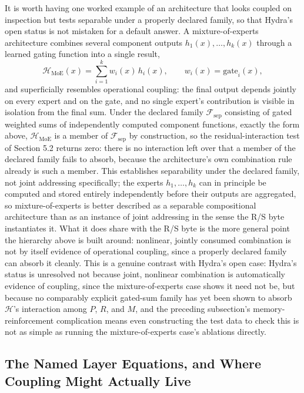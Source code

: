 \documentclass[11pt]{article}
\begin{document}
It is worth having one worked example of an architecture that looks coupled on inspection but tests separable under a properly declared family, so that Hydra's open status is not mistaken for a default answer. A mixture-of-experts architecture combines several component outputs $h_1(x), \ldots, h_k(x)$ through a learned gating function into a single result,
\[
\mathcal{H}_{\mathrm{MoE}}(x) = \sum_{i=1}^{k} w_i(x)\, h_i(x), \qquad w_i(x) = \mathrm{gate}_i(x),
\]
and superficially resembles operational coupling: the final output depends jointly on every expert and on the gate, and no single expert's contribution is visible in isolation from the final sum. Under the declared family $\mathcal{F}_{\mathrm{sep}}$ consisting of gated weighted sums of independently computed component functions, exactly the form above, $\mathcal{H}_{\mathrm{MoE}}$ is a member of $\mathcal{F}_{\mathrm{sep}}$ by construction, so the residual-interaction test of Section 5.2 returns zero: there is no interaction left over that a member of the declared family fails to absorb, because the architecture's own combination rule already is such a member. This establishes separability under the declared family, not joint addressing specifically; the experts $h_1, \ldots, h_k$ can in principle be computed and stored entirely independently before their outputs are aggregated, so mixture-of-experts is better described as a separable compositional architecture than as an instance of joint addressing in the sense the R/S byte instantiates it. What it does share with the R/S byte is the more general point the hierarchy above is built around: nonlinear, jointly consumed combination is not by itself evidence of operational coupling, since a properly declared family can absorb it cleanly. This is a genuine contrast with Hydra's open case: Hydra's status is unresolved not because joint, nonlinear combination is automatically evidence of coupling, since the mixture-of-experts case shows it need not be, but because no comparably explicit gated-sum family has yet been shown to absorb $\mathcal{H}$'s interaction among $P$, $R$, and $M$, and the preceding subsection's memory-reinforcement complication means even constructing the test data to check this is not as simple as running the mixture-of-experts case's ablations directly.

\subsection{The Named Layer Equations, and Where Coupling Might Actually Live}
\end{document}
